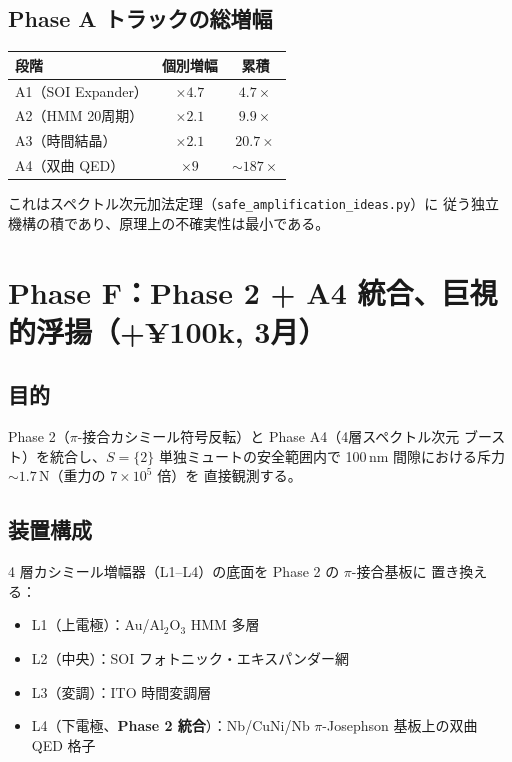 \documentclass[11pt,a4paper]{article}
\begin{document}
\subsection{Phase A トラックの総増幅}

\begin{center}
\begin{tabular}{lcc}
\toprule
段階 & 個別増幅 & 累積 \\
\midrule
A1（SOI Expander）        & $\times 4.7$ & $4.7\times$ \\
A2（HMM 20周期）          & $\times 2.1$ & $9.9\times$ \\
A3（時間結晶）             & $\times 2.1$ & $20.7\times$ \\
A4（双曲 QED）             & $\times 9$   & $\sim 187\times$ \\
\bottomrule
\end{tabular}
\end{center}

これはスペクトル次元加法定理（\texttt{safe\_amplification\_ideas.py}）に
従う独立機構の積であり、原理上の不確実性は最小である。

\section{Phase F：Phase 2 + A4 統合、巨視的浮揚（+¥100k, 3月）}
\label{sec:phase_F}

\subsection{目的}

Phase 2（$\pi$-接合カシミール符号反転）と Phase A4（4層スペクトル次元
ブースト）を統合し、$S=\{2\}$ 単独ミュートの安全範囲内で
100\,nm 間隙における斥力 $\sim 1.7$\,N（重力の $7\times 10^5$ 倍）を
直接観測する。

\subsection{装置構成}

4 層カシミール増幅器（L1--L4）の底面を Phase 2 の $\pi$-接合基板に
置き換える：
\begin{itemize}
\item L1（上電極）：Au/Al$_2$O$_3$ HMM 多層
\item L2（中央）：SOI フォトニック・エキスパンダー網
\item L3（変調）：ITO 時間変調層
\item L4（下電極、\textbf{Phase 2 統合}）：Nb/CuNi/Nb $\pi$-Josephson
  基板上の双曲 QED 格子
\end{itemize}
\end{document}
